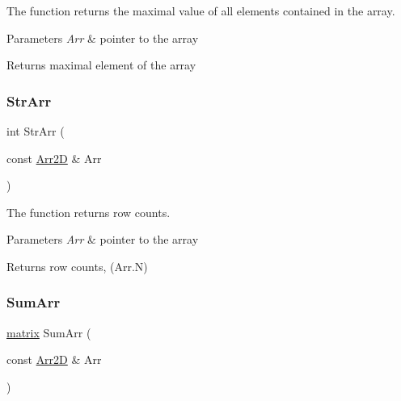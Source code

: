 The function returns the maximal value of all elements contained in the array. 


\begin{DoxyParams}{Parameters}
{\em Arr} & pointer to the array \\
\hline
\end{DoxyParams}
\begin{DoxyReturn}{Returns}
maximal element of the array 
\end{DoxyReturn}
\mbox{\label{class_arr2_d_a2bb49591960104f03344c72f4cf50d66}} 
\subsubsection{\texorpdfstring{Str\+Arr}{StrArr}}
{\footnotesize\ttfamily int Str\+Arr (\begin{DoxyParamCaption}\item[{const \mbox{\hyperlink{class_arr2_d}{Arr2D}} \&}]{Arr }\end{DoxyParamCaption})\hspace{0.3cm}{\ttfamily [friend]}}



The function returns row counts. 


\begin{DoxyParams}{Parameters}
{\em Arr} & pointer to the array \\
\hline
\end{DoxyParams}
\begin{DoxyReturn}{Returns}
row counts, (Arr.\+N) 
\end{DoxyReturn}
\mbox{\label{class_arr2_d_a51c6d259f0af23458e423bf168730528}} 
\subsubsection{\texorpdfstring{Sum\+Arr}{SumArr}}
{\footnotesize\ttfamily \mbox{\hyperlink{classmatrix}{matrix}} Sum\+Arr (\begin{DoxyParamCaption}\item[{const \mbox{\hyperlink{class_arr2_d}{Arr2D}} \&}]{Arr }\end{DoxyParamCaption})\hspace{0.3cm}{\ttfamily [friend]}}



